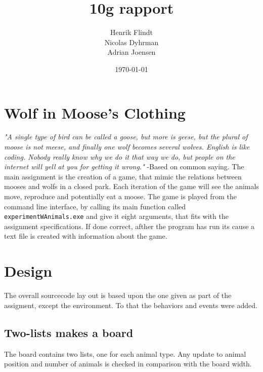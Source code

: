 \documentclass{article}
\title{10g rapport}
\author{Henrik Flindt\\Nicolas Dyhrman\\Adrian Joensen}
\date{\today}
\begin{document}
    \maketitle
    
    \section*{Wolf in Moose's Clothing}
    \textit{"A single type of bird can be called a goose, but more is geese, but the plural of moose is not meese, and finally one wolf becomes several wolves. English is like coding. Nobody really know why we do it that way we do, but people on the internet will yell at you for getting it wrong."} \newline -Based on common saying. \newline \newline
    The main assignment is the creation of a game, that mimic the relations between mooses and wolfs in a closed park. Each iteration of the game will see the animals move, reproduce and potentially eat a moose. The game is played from the command line interface, by calling its main function called \verb|experimentWAnimals.exe| and give it eight arguments, that fits with the assignment specifications. If done correct, afther the program has run its cause a text file is created with information about the game. 


    \section{Design}
    	The overall sourcecode lay out is based upon the one given as part of the assigment, except the environment. To that the behaviors and events were added. 
    
   
   
    \subsection{Two-lists makes a board}
    The board contains two lists, one for each animal type. Any update to animal position and number of animals is checked in comparison with the board width.  
\end{document}

